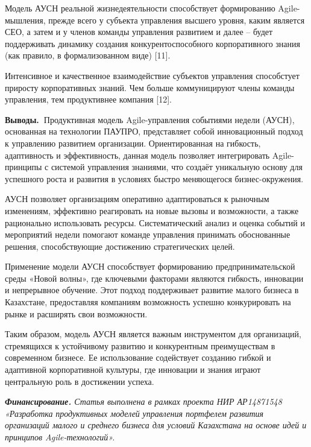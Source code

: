 \begin{multicols}{2}
Модель АУСН реальной жизнедеятельности способствует формированию
Agile-мышления, прежде всего у субъекта управления высшего уровня, каким
является СЕО, а затем и у членов команды управления развитием и далее --
будет поддерживать динамику создания конкурентоспособного корпоративного
знания (как правило, в формализованном виде) {[}11{]}.

Интенсивное и качественное взаимодействие субъектов управления
способстует приросту корпоративных знаний. Чем больше коммуницируют
члены команды управления, тем продуктивнее компания {[}12{]}.

{\bfseries Выводы.~}Продуктивная модель Agile-управления событиями недели
(АУСН), основанная на технологии ПАУПРО, представляет собой
инновационный подход к управлению развитием организации. Ориентированная
на гибкость, адаптивность и эффективность, данная модель позволяет
интегрировать Agile-принципы с системой управления знаниями, что создаёт
уникальную основу для успешного роста и развития в условиях быстро
меняющегося бизнес-окружения.

АУСН позволяет организациям оперативно адаптироваться к рыночным
изменениям, эффективно реагировать на новые вызовы и возможности, а
также рационально использовать ресурсы. Систематический анализ и оценка
событий и мероприятий недели помогают команде управления принимать
обоснованные решения, способствующие достижению стратегических целей.

Применение модели АУСН способствует формированию предпринимательской
среды «Новой волны», где ключевыми факторами являются гибкость,
инновации и непрерывное обучение. Этот подход поддерживает развитие
малого бизнеса в Казахстане, предоставляя компаниям возможность успешно
конкурировать на рынке и расширять свои возможности.

Таким образом, модель АУСН является важным инструментом для организаций,
стремящихся к устойчивому развитию и конкурентным преимуществам в
современном бизнесе. Ее использование содействует созданию гибкой и
адаптивной корпоративной культуры, где инновации и знания играют
центральную роль в достижении успеха.

\emph{{\bfseries Финансирование.} Статья выполнена в рамках проекта НИР
АР14871548 «}\emph{Разработка} \emph{продуктивных моделей}
\emph{управления портфелем развития организаций малого и среднего
бизнеса для условий Казахстана на основе идей и принципов
Agile-технологий».}
\end{multicols}


